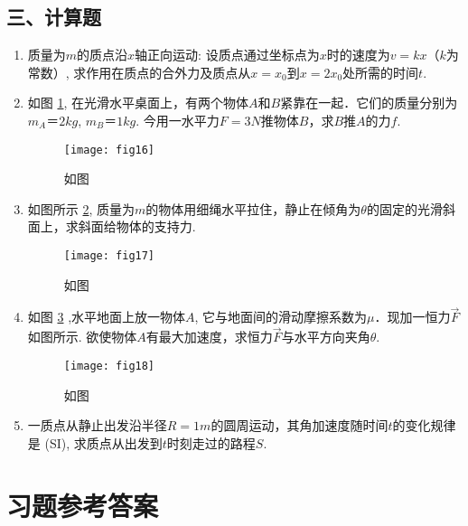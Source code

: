 \subsection*{三、计算题}
\begin{enumerate}
    \item 质量为$m$的质点沿$x$轴正向运动: 设质点通过坐标点为$x$时的速度为$v=kx$（$k$为常数）, 求作用在质点的合外力及质点从$x=x_0$到$x=2x_0$处所需的时间$t$.
    \item 如图 \ref{fig:16}, 在光滑水平桌面上，有两个物体$A$和$B$紧靠在一起．它们的质量分别为$m_A＝2kg$, $m_B＝1kg$. 今用一水平力$F=3N$推物体$B$，求$B$推$A$的力$f$. 
    \begin{figure}[ht]
        \centering
        \texttt{[image: fig16]}
            \caption{如图}\label{fig:16}
    \end{figure}
    \item 如图所示 \ref{fig:17}, 质量为$m$的物体用细绳水平拉住，静止在倾角为$\theta$的固定的光滑斜面上，求斜面给物体的支持力.
    \begin{figure}[h]
        \centering
        \texttt{[image: fig17]}
            \caption{如图}\label{fig:17}
    \end{figure}

     \item 如图 \ref{fig:18} ,水平地面上放一物体$A$, 它与地面间的滑动摩擦系数为$\mu$．现加一恒力$\vec{F}$如图所示. 欲使物体$A$有最大加速度，求恒力$\vec{F}$与水平方向夹角$\theta$.
     \begin{figure}[H]
        \centering
        \texttt{[image: fig18]}
            \caption{如图}\label{fig:18}
    \end{figure}
    \item 一质点从静止出发沿半径$R=1m$的圆周运动，其角加速度随时间$t$的变化规律是 (SI), 求质点从出发到$t$时刻走过的路程$S$.
        
\end{enumerate}

\section{习题参考答案}
